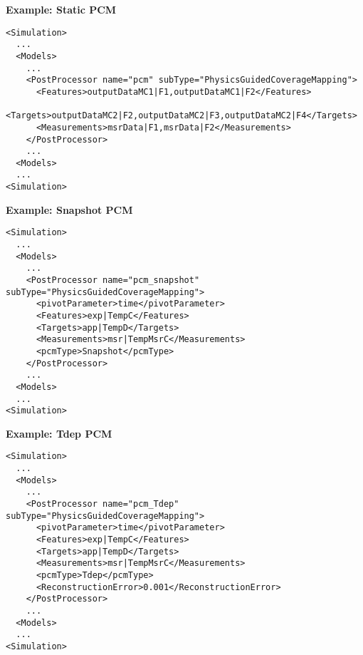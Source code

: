 \textbf{Example: Static PCM}
\begin{lstlisting}[style=XML,morekeywords={subType}]
<Simulation>
  ...
  <Models>
    ...
    <PostProcessor name="pcm" subType="PhysicsGuidedCoverageMapping">
      <Features>outputDataMC1|F1,outputDataMC1|F2</Features>
      <Targets>outputDataMC2|F2,outputDataMC2|F3,outputDataMC2|F4</Targets>
      <Measurements>msrData|F1,msrData|F2</Measurements>
    </PostProcessor>
    ...
  <Models>
  ...
<Simulation>
\end{lstlisting}

\textbf{Example: Snapshot PCM}
\begin{lstlisting}[style=XML,morekeywords={subType}]
<Simulation>
  ...
  <Models>
    ...
    <PostProcessor name="pcm_snapshot" subType="PhysicsGuidedCoverageMapping">
      <pivotParameter>time</pivotParameter>
      <Features>exp|TempC</Features>
      <Targets>app|TempD</Targets>
      <Measurements>msr|TempMsrC</Measurements>
      <pcmType>Snapshot</pcmType>
    </PostProcessor>
    ...
  <Models>
  ...
<Simulation>
\end{lstlisting}

\textbf{Example: Tdep PCM}
\begin{lstlisting}[style=XML,morekeywords={subType}]
<Simulation>
  ...
  <Models>
    ...
    <PostProcessor name="pcm_Tdep" subType="PhysicsGuidedCoverageMapping">
      <pivotParameter>time</pivotParameter>
      <Features>exp|TempC</Features>
      <Targets>app|TempD</Targets>
      <Measurements>msr|TempMsrC</Measurements>
      <pcmType>Tdep</pcmType>
      <ReconstructionError>0.001</ReconstructionError>
    </PostProcessor>
    ...
  <Models>
  ...
<Simulation>
\end{lstlisting}

